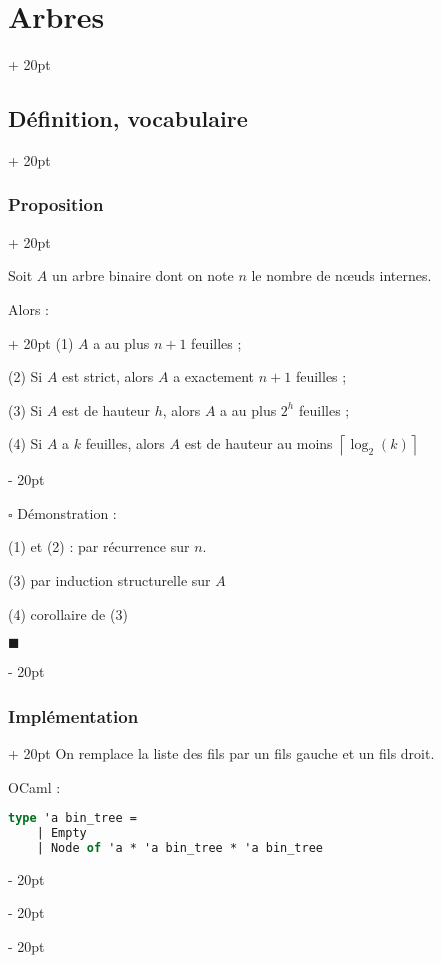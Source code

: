\documentclass[a4paper, 12pt, twoside]{article}
\newcommand{\ind}[1][20pt]{\advance\leftskip + #1}
\newcommand{\deind}[1][20pt]{\advance\leftskip - #1}
\newenvironment{indt}[2][20pt]{#2 \par \ind[#1]}{\par \deind} %
\begin{document}
\begin{indt}{\section{Arbres}}
\begin{indt}{\subsection{Définition, vocabulaire}}
            \vspace{12pt}
            
            \begin{indt}{\subsubsection{Proposition}}
                \label{1.1.10}
                
                Soit $A$ un arbre binaire dont on note $n$ le nombre de n\oe uds internes.
                
                \begin{indt}{Alors :}
                    (1) $A$ a au plus $n + 1$ feuilles ;
                    
                    (2) Si $A$ est strict, alors $A$ a exactement $n + 1$ feuilles ;
                    
                    (3) Si $A$ est de hauteur $h$, alors $A$ a au plus $2^h$ feuilles ;
                    
                    (4) Si $A$ a $k$ feuilles, alors $A$ est de hauteur au moins $\left\lceil \log_2 (k) \right\rceil$
                \end{indt}
                
                \vspace{12pt}
                
                $\square$ Démonstration :
                
                (1) et (2) : par récurrence sur $n$.
                
                (3) par induction structurelle sur $A$
                
                (4) corollaire de (3)
                
                $\blacksquare$
            \end{indt}
            
            \vspace{12pt}
            
            \begin{indt}{\subsubsection{Implémentation}}
                \label{1.1.11}
                On remplace la liste des fils par un fils gauche et un fils droit.
                
                OCaml :
                \begin{lstlisting}[language=Caml, xleftmargin=80pt]
type 'a bin_tree =
    | Empty
    | Node of 'a * 'a bin_tree * 'a bin_tree\end{lstlisting}
                

\end{indt}
\end{indt}
\end{indt}
\end{document}
